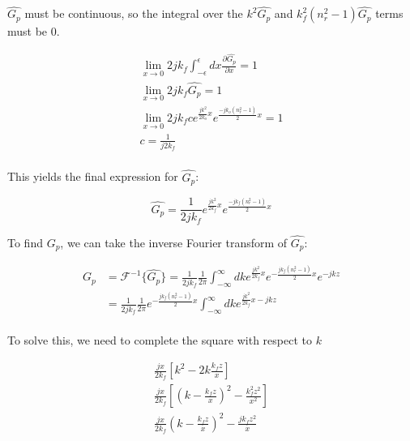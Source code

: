 \noindent $\hat{G_p}$ must be continuous, so the integral over the $k^2\hat{G_p}$ and $k_f^2(n_r^2-1)\hat{G_p}$ terms must be 0.

\begin{equation}
\begin{gathered}
\lim_{x\rightarrow 0}2jk_f\int_{-\epsilon}^{\epsilon}dx\frac{\partial\hat{G_p}}{\partial x}= 1\\
\lim_{x\rightarrow 0}2jk_f\hat{G_p} = 1 \\
\lim_{x\rightarrow 0}2jk_fce^{\frac{jk^2}{2k_o}x}e^{\frac{-jk_o(n_r^2-1)}{2}x} = 1\\
c = \frac{1}{j2k_f}\\
\end{gathered}
\label{gf_eq:11cb}
\end{equation}
 \renewcommand{\baselinestretch}{2} \small\normalsize
 
\noindent This yields the final expression for $\hat{G_p}$:

\begin{equation}
\hat{G_p}= \frac{1}{2jk_f}e^{\frac{jk^2}{2k_f}x}e^{\frac{-jk_f(n_r^2-1)}{2}x}
\label{gf_eq:11cc}
\end{equation}
 \renewcommand{\baselinestretch}{2} \small\normalsize
 
\noindent To find $G_p$, we can take the inverse Fourier transform of $\hat{G_p}$:

\begin{equation}
\begin{aligned}
G_p &= \mathcal{F}^{-1}\{\hat{G_p}\} = \frac{1}{2jk_f}\frac{1}{2\pi}\int_{-\infty}^{\infty}dk e^{\frac{jk^2}{2k_f}x}e^{-\frac{jk_f(n_r^2-1)}{2}x}e^{-jkz} \\
& = \frac{1}{2jk_f}\frac{1}{2\pi}e^{-\frac{jk_f(n_r^2-1)}{2}x}\int_{-\infty}^{\infty}dk e^{\frac{jk^2}{2k_f}x-jkz} \\
\end{aligned}
\label{gf_eq:11d}
\end{equation}
 \renewcommand{\baselinestretch}{2} \small\normalsize
 
\noindent To solve this, we need to complete the square with respect to $k$

\begin{equation}
\begin{gathered}
\frac{jx}{2k_f}\left[k^2  -2k\frac{k_fz}{x}\right]\\
\frac{jx}{2k_f}\left[\left(k - \frac{k_fz}{x}\right)^2 - \frac{k_f^2z^2}{x^2} \right]\\
\frac{jx}{2k_f}\left(k - \frac{k_fz}{x}\right)^2 - \frac{jk_fz^2}{x}\\
\end{gathered}
\label{gf_eq:11e}
\end{equation}
 \renewcommand{\baselinestretch}{2} \small\normalsize
 
